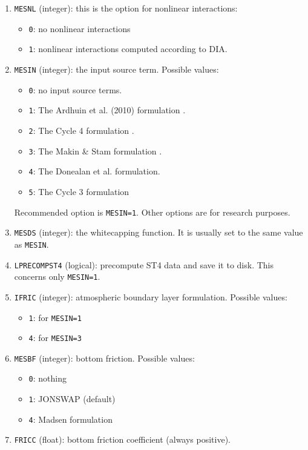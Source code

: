 \documentclass[12pt]{amsart}
\begin{document}
\begin{enumerate}
\item {\tt MESNL} (integer): this is the option for nonlinear interactions:
  \begin{itemize}
  \item {\tt 0}: no nonlinear interactions
  \item {\tt 1}: nonlinear interactions computed according to DIA.
  \end{itemize}
\item {\tt MESIN} (integer): the input source term. Possible values:
  \begin{itemize}
  \item {\tt 0}: no input source terms. 
  \item {\tt 1}: The Ardhuin et al. (2010) formulation \cite{ArdhuinSurfaceStressFormulation}.
  \item {\tt 2}: The Cycle 4 formulation \cite{CycleIV}.
  \item {\tt 3}: The Makin \& Stam formulation \cite{MakinStam}.
  \item {\tt 4}: The Donealan et al. formulation.
  \item {\tt 5}: The Cycle 3 formulation
  \end{itemize}
Recommended option is {\tt MESIN=1}. Other options are for research purposes.
\item {\tt MESDS} (integer): the whitecapping function. It is usually set to the same value as {\tt MESIN}.
\item {\tt LPRECOMPST4} (logical): precompute ST4 data and save it to disk. This concerns only {\tt MESIN=1}. 
\item {\tt IFRIC} (integer): atmospheric boundary layer formulation. Possible values:
  \begin{itemize}
  \item {\tt 1}: for {\tt MESIN=1}
  \item {\tt 4}: for {\tt MESIN=3}
  \end{itemize}
\item {\tt MESBF} (integer): bottom friction. Possible values:
  \begin{itemize}
  \item {\tt 0}: nothing
  \item {\tt 1}: JONSWAP (default)
  \item {\tt 4}: Madsen formulation
  \end{itemize}
\item {\tt FRICC} (float): bottom friction coefficient (always positive).

\end{enumerate}
\end{document}

